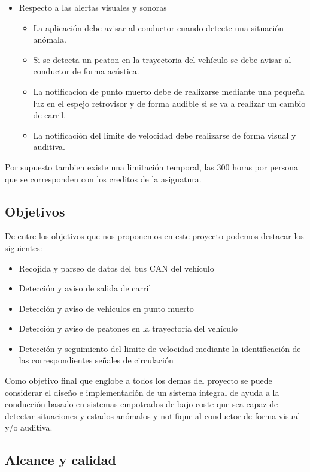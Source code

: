 \begin{itemize}
    \item Respecto a las alertas visuales y sonoras
    \begin{itemize}
        \item La aplicación debe avisar al conductor cuando detecte una situación anómala.
        \item Si se detecta un peaton en la trayectoria del vehículo se debe avisar al conductor de forma acústica.
        \item La notificacion de punto muerto debe de realizarse mediante una pequeña luz en el espejo retrovisor y de forma audible si se va a realizar un cambio de carril.
        \item La notificación del limite de velocidad debe realizarse de forma visual y auditiva.
    \end{itemize}

\end{itemize}

Por supuesto tambien existe una limitación temporal, las 300 horas por persona que se corresponden con los creditos de la asignatura.


\subsection{Objetivos}\label{sec_objetivos}
De entre los objetivos que nos proponemos en este proyecto podemos destacar los siguientes:
\begin{itemize}
    \item Recojida y parseo de datos del bus CAN del vehículo
    \item Detección y aviso de salida de carril
    \item Detección y aviso de vehiculos en punto muerto
    \item Detección y aviso de peatones en la trayectoria del vehículo
    \item Detección y seguimiento del limite de velocidad mediante la identificación de las correspondientes señales de circulación
\end{itemize}

Como objetivo final que englobe a todos los demas del proyecto se puede considerar el diseño e implementación de un sistema integral de ayuda a la conducción basado en sistemas empotrados de bajo coste que sea capaz de detectar situaciones y estados anómalos y notifique al conductor de forma visual y/o auditiva.


\subsection{Alcance y calidad}

